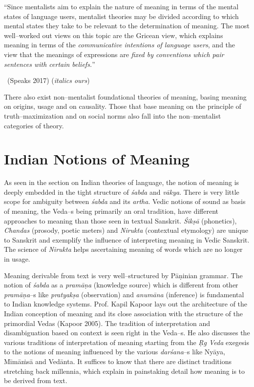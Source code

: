 \begin{myquote}
“Since mentalists aim to explain the nature of meaning in terms of the mental states of language users, mentalist theories may be divided according to which mental states they take to be relevant to the determination of meaning. The most well–worked out views on this topic are the Gricean view, which explains meaning in terms of the \textit{communicative intentions of language users}, and the view that the meanings of expressions are \textit{fixed by conventions which pair sentences with certain beliefs.}” 

~\hfill (Speaks 2017) (\textit{italics ours})
\end{myquote}

There also exist non–mentalist foundational theories of meaning, basing meaning on origins, usage and on causality. Those that base meaning on the principle of truth–maximization and on social norms also fall into the non–mentalist categories of theory.


\section*{Indian Notions of Meaning}

As seen in the section on Indian theories of language, the notion of meaning is deeply embedded in the tight structure of \textit{śabda} and \textit{vākya}. There is very little scope for ambiguity between \textit{śabda} and its \textit{artha}. Vedic notions of sound as basis of meaning, the Veda–s being primarily an oral tradition, have different approaches to meaning than those seen in textual Sanskrit. \textit{Śikṣā} (phonetics), \textit{Chandas} (prosody, poetic meters) and \textit{Nirukta} (contextual etymology) are unique to Sanskrit and exemplify the influence of interpreting meaning in Vedic Sanskrit. The science of \textit{Nirukta} helps ascertaining meaning of words which are no longer in usage.

Meaning derivable from text is very well–structured by Pāṇinian grammar. The notion of \textit{śabda} as a \textit{pramāṇa} (knowledge source) which is different from other \textit{pramāṇa}–s like \textit{pratyakṣa} (observation) and \textit{anumāna} (inference) is fundamental to Indian knowledge systems. Prof. Kapil Kapoor lays out the architecture of the Indian conception of meaning and its close association with the structure of the primordial Vedas (Kapoor 2005). The tradition of interpretation and disambiguation based on context is seen right in the Veda–s. He also discusses the various traditions of interpretation of meaning starting from the \textit{Ṛg Veda} exegesis to the notions of meaning influenced by the various \textit{darśana}–s like Nyāya, Mīmāṁsā and Vedānta. It suffices to know that there are distinct traditions stretching back millennia, which explain in painstaking detail how meaning is to be derived from text.

